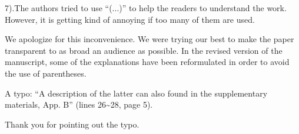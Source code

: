 \begin{reviewer}
7).The authors tried to use  ``(...)'' to help the readers to understand the work. However, it is getting kind of annoying if too many of them are used.
\end{reviewer}
\begin{authors}
We apologize for this inconvenience.
We were trying our best to make the paper transparent to as broad an audience as possible.
In the revised version of the manuscript, some of the explanations have been reformulated in order to avoid the use of parentheses.

\begin{actions}
\end{actions}
\end{authors}

\begin{reviewer}
A typo: ``A description of the latter can also found in the supplementary materials, App. B'' (lines 26\~{}28, page 5).
\end{reviewer}
\begin{authors}
Thank you for pointing out the typo.

\begin{actions}
\end{actions}
\end{authors}
